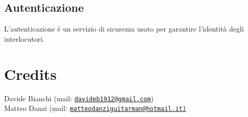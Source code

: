 \documentclass[a4paper, 11pt]{article}
\newcommand{\mail}[1]{\href{mailto:#1}{\texttt{#1}}}
\begin{document}
\begin{multicols}{2}
		\section{Autenticazione}
		L'autenticazione è un servizio di sicurezza usato per garantire l'identità degli interlocutori.
		
		
		
		
		
		
	
	
	
	
	
	
	
	
	
	
	
	
	
	\end{multicols}

	\section{Credits}
	Davide Bianchi (mail: \mail{davideb1912@gmail.com}) \\
	Matteo Danzi (mail: \mail{matteodanziguitarman@hotmail.it)}
	
\end{document}
